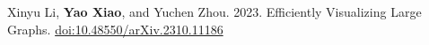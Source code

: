 Xinyu Li\equalcontrib, \textbf{Yao Xiao\equalcontrib}, and Yuchen Zhou\equalcontrib. 2023. Efficiently Visualizing Large Graphs. \href{https://doi.org/10.48550/arXiv.2310.11186}{doi:10.48550/arXiv.2310.11186}
